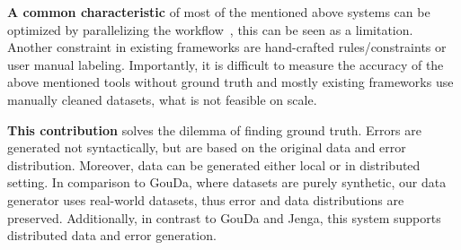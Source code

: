 
\textbf{A common characteristic} of most of the mentioned above systems can be optimized by parallelizing the workflow~\cite{raha, baran, RekatsinasCIR2017, holodetect, RestatGCS2022, jenga}, this can be seen as a limitation.
Another constraint in existing frameworks are hand-crafted rules/constraints or user manual labeling.
Importantly, it is difficult to measure the accuracy of the above mentioned tools without ground truth and mostly existing frameworks use manually cleaned datasets, what is not feasible on scale.

\textbf{This contribution} solves the dilemma of finding ground truth.
Errors are generated not syntactically, but are based on the original data and error distribution.
Moreover, data can be generated either local or in distributed setting.
In comparison to GouDa, where datasets are purely synthetic, our data generator uses real-world datasets,
thus error and data distributions are preserved. 
Additionally, in contrast to GouDa and Jenga, this system supports distributed data and error generation.

